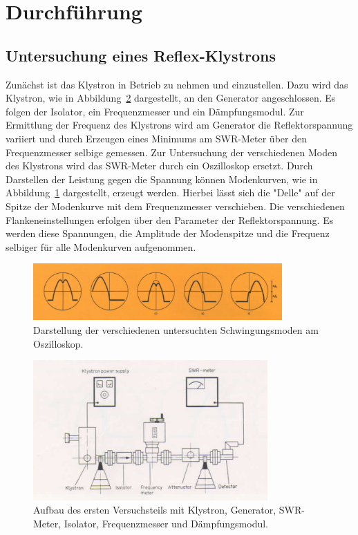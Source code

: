 \section{Durchführung}
\label{sec:durchführung}

\subsection{Untersuchung eines Reflex-Klystrons}

Zunächst ist das Klystron in Betrieb zu nehmen und einzustellen.
Dazu wird das Klystron, wie in Abbildung~\ref{fig:aufbau1} dargestellt, an den Generator angeschlossen.
Es folgen der Isolator, ein Frequenzmesser und ein Dämpfungsmodul.
Zur Ermittlung der Frequenz des Klystrons wird am Generator die Reflektorspannung variiert und durch Erzeugen eines Minimums am SWR-Meter über den Frequenzmesser selbige gemessen.
Zur Untersuchung der verschiedenen Moden des Klystrons wird das SWR-Meter durch ein Oszilloskop ersetzt.
Durch Darstellen der Leistung gegen die Spannung können Modenkurven, wie in Abbildung~\ref{fig:moden} dargestellt, erzeugt werden.
Hierbei lässt sich die "Delle" auf der Spitze der Modenkurve mit dem Frequenzmesser verschieben. Die verschiedenen Flankeneinstellungen erfolgen über den Parameter der Reflektorspannung.
Es werden diese Spannungen, die Amplitude der Modenspitze und die Frequenz selbiger für alle Modenkurven aufgenommen.
%
\begin{figure}[h]
    \centering
    \includegraphics[width=0.85\textwidth]{figure/Moden.PNG}
    \caption{Darstellung der verschiedenen untersuchten Schwingungsmoden am Oszilloskop.\cite{V53}}
    \label{fig:moden}
\end{figure}
%
\begin{figure}[h]
    \centering
    \includegraphics[width=0.8\textwidth]{figure/Aufbau_1.PNG}
    \caption{Aufbau des ersten Versuchsteils mit Klystron, Generator, SWR-Meter, Isolator, Frequenzmesser und Dämpfungsmodul.\cite{V53}}
    \label{fig:aufbau1}
\end{figure}

